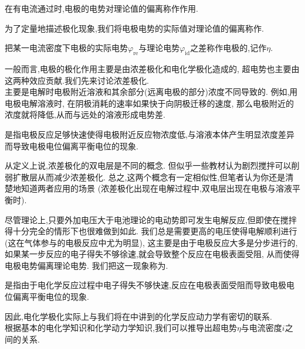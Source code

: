 \documentclass{ctexart}
\begin{document}
\begin{definition}[6E.1.3 极化]
    在有电流通过时,电极的电势对理论值的偏离称作作用.
\end{definition}
为了定量地描述极化现象,我们将电极电势的实际值对理论值的偏离称作.
\begin{definition}[6E.1.4 超电势]
    把某一电流密度下电极的实际电势$\varphi_{\text{re}}$与理论电势$\varphi_{\text{id}}$之差称作电极的,记作$\eta$.
\end{definition}
一般而言,电极的极化作用主要是由浓差极化和电化学极化造成的,%
超电势也主要由这两种效应贡献.我们先来讨论浓差极化.\\
\indent {}主要是电解时电极附近溶液和其余部分(远离电极的部分)浓度不同导致的.%
例如,用电极电解溶液时,%
在阴极消耗的速率如果快于向阴极迁移的速度,%
那么电极附近的浓度就将降低,从而与远处的溶液形成电势差.
\begin{definition}[6E.1.5 浓差极化]
    是指电极反应足够快速使得电极附近反应物浓度低,与溶液本体产生明显浓度差异而导致电极电位偏离平衡电位的现象.
\end{definition}
\begin{hint}
    从定义上说,浓差极化的双电层是不同的概念.%
    但似乎一些教材认为剧烈搅拌可以削弱扩散层从而减少浓差极化.%
    总之,这两个概念有一定相似性,但笔者认为你还是清楚地知道两者应用的场景%
    (浓差极化出现在电解过程中,双电层出现在电极与溶液平衡时).
\end{hint}
尽管理论上,只要外加电压大于电池理论的电动势即可发生电解反应,但即使在搅拌得十分完全的情形下也很难做到如此.%
我们总是需要更高的电压使得电解顺利进行(这在气体参与的电极反应中尤为明显),%
这主要是由于电极反应大多是分步进行的,如果某一步反应的电子得失不够徐速,就会导致整个反应在电极表面受阻,%
从而使得电极电势偏离理论电势.%
我们把这一现象称为.
\begin{definition}[6E.1.6 电化学极化]
    是指由于电化学反应过程中电子得失不够快速,反应在电极表面受阻而导致电极电位偏离平衡电位的现象.
\end{definition}
因此,电化学极化实际上与我们将在中讲到的化学反应动力学有密切的联系.\vspace{12pt}\\
\indent 根据基本的电化学知识和化学动力学知识,我们可以推导出超电势$\eta$与电流密度$i$之间的关系.
\end{document}
